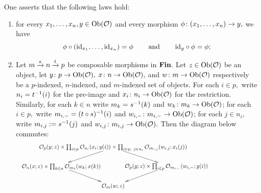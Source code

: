 \documentclass[CT4S-EN-RU]{subfiles}
\begin{document}
\begin{definitionENG}
One asserts that the following laws hold:
\begin{enumerate}[\hsp 1.]
\item for every $x_1,\ldots,x_n,y\in\textnormal{Ob}(\mathcal{O})$ and every morphism $\phi\colon(x_1,\ldots,x_n)\rightarrow y,$ we have
$$\phi\circ(\textnormal{id}_{x_1},\ldots,\textnormal{id}_{x_n})=\phi\hspace{.3in}\textnormal{and}\hspace{.3in}\textnormal{id}_y\circ\phi=\phi;$$
\item Let $m\xrightarrow{s}n\xrightarrow{t}p$ be composable morphisms in ${\mathbf{Fin}}.$ Let $z\in\textnormal{Ob}(\mathcal{O})$ be an object, let $y\colon p\rightarrow\textnormal{Ob}(\mathcal{O}),$ $x\colon n\rightarrow\textnormal{Ob}(\mathcal{O}),$ and $w\colon m\rightarrow\textnormal{Ob}(\mathcal{O})$ respectively be a $p$-indexed, $n$-indexed, and $m$-indexed set of objects. For each $i\in p,$ write $n_i=t^\m1(i)$ for the pre-image and $x_i\colon n_i\rightarrow\textnormal{Ob}(\mathcal{O})$ for the restriction. Similarly, for each $k\in n$ write $m_k=s^\m1(k)$ and $w_k\colon m_k\rightarrow\textnormal{Ob}(\mathcal{O})$; for each $i\in p,$ write $m_{i,-}=(t\circ s)^\m1(i)$ and $w_{i,-}\colon m_{i,-}\rightarrow\textnormal{Ob}(\mathcal{O})$; for each $j\in n_i,$ write $m_{i,j}:=s^\m1(j)$ and $w_{i,j}\colon m_{i,j}\rightarrow\textnormal{Ob}(\mathcal{O}).$ Then the diagram below commutes:
$$\hspace{-1.4in}\xymatrix@=18pt{
&
{\hspace{.9in}\color{white}\prod\color{black}}
\save[]+<0cm,0cm>*\txt<30pc>{$
\mcO_p(y;z)\times\prod_{i\in p}\mcO_{n_i}(x_i;y(i))\times\prod_{i\in p,\ j\in n_i}\mcO_{m_{i,j}}(w_{i,j};x_i(j))
$}
\ar[rd]\ar[ld]
\restore\\
{\hspace{1in}\color{white}\prod\color{black}}
\save[]+<.4cm,0cm>*\txt<30pc>{$
\mcO_n(x;z)\times\prod_{k\in n}\mcO_{m_k}(w_k;x(k))
$}
\ar[dr]
\restore&&
{\hspace{1in}\color{white}\prod\color{black}}
\save[]+<-.3cm,0cm>*\txt<30pc>{$
\mcO_p(y;z)\times\prod_{i\in p}\mcO_{m_{i,-}}(w_{i,-};y(i))
$}
\ar[dl]
\restore\\
&\mcO_m(w;z)
}
$$
\end{enumerate}
\end{definitionENG}

\begin{definitionRUS}\label{def:operad}
\end{definitionRUS}
\end{document}
